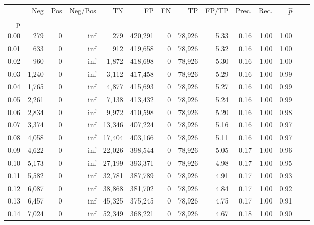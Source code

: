 \begin{tabular}{rrrrrrrrrrrrrr}
\toprule
{} &    Neg &    Pos &  Neg/Pos &       TN &       FP &      FN &      TP & FP/TP & Prec. &  Rec. & $\hat{p}$ \\
p    &        &        &          &          &          &         &         &       &       &       &           \\
\midrule
0.00 &    279 &      0 &      inf &      279 &  420,291 &       0 &  78,926 &  5.33 &  0.16 &  1.00 &      1.00 \\
0.01 &    633 &      0 &      inf &      912 &  419,658 &       0 &  78,926 &  5.32 &  0.16 &  1.00 &      1.00 \\
0.02 &    960 &      0 &      inf &    1,872 &  418,698 &       0 &  78,926 &  5.30 &  0.16 &  1.00 &      1.00 \\
0.03 &  1,240 &      0 &      inf &    3,112 &  417,458 &       0 &  78,926 &  5.29 &  0.16 &  1.00 &      0.99 \\
0.04 &  1,765 &      0 &      inf &    4,877 &  415,693 &       0 &  78,926 &  5.27 &  0.16 &  1.00 &      0.99 \\
0.05 &  2,261 &      0 &      inf &    7,138 &  413,432 &       0 &  78,926 &  5.24 &  0.16 &  1.00 &      0.99 \\
0.06 &  2,834 &      0 &      inf &    9,972 &  410,598 &       0 &  78,926 &  5.20 &  0.16 &  1.00 &      0.98 \\
0.07 &  3,374 &      0 &      inf &   13,346 &  407,224 &       0 &  78,926 &  5.16 &  0.16 &  1.00 &      0.97 \\
0.08 &  4,058 &      0 &      inf &   17,404 &  403,166 &       0 &  78,926 &  5.11 &  0.16 &  1.00 &      0.97 \\
0.09 &  4,622 &      0 &      inf &   22,026 &  398,544 &       0 &  78,926 &  5.05 &  0.17 &  1.00 &      0.96 \\
0.10 &  5,173 &      0 &      inf &   27,199 &  393,371 &       0 &  78,926 &  4.98 &  0.17 &  1.00 &      0.95 \\
0.11 &  5,582 &      0 &      inf &   32,781 &  387,789 &       0 &  78,926 &  4.91 &  0.17 &  1.00 &      0.93 \\
0.12 &  6,087 &      0 &      inf &   38,868 &  381,702 &       0 &  78,926 &  4.84 &  0.17 &  1.00 &      0.92 \\
0.13 &  6,457 &      0 &      inf &   45,325 &  375,245 &       0 &  78,926 &  4.75 &  0.17 &  1.00 &      0.91 \\
0.14 &  7,024 &      0 &      inf &   52,349 &  368,221 &       0 &  78,926 &  4.67 &  0.18 &  1.00 &      0.90 \\

\end{tabular}

